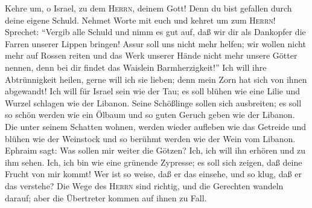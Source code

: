 Kehre um, o Israel, zu dem \textsc{Herrn}, deinem Gott!
Denn du bist gefallen durch deine eigene Schuld.  Nehmet
Worte mit euch und kehret um zum \textsc{Herrn}! Sprechet: ``Vergib alle
Schuld und nimm es gut auf, daß wir dir als Dankopfer die Farren unserer
Lippen bringen!  Assur soll uns nicht mehr helfen; wir
wollen nicht mehr auf Rossen reiten und das Werk unserer Hände nicht
mehr unsere Götter nennen, denn bei dir findet das Waislein
Barmherzigkeit!''  Ich will ihre Abtrünnigkeit heilen,
gerne will ich sie lieben; denn mein Zorn hat sich von ihnen abgewandt!
 Ich will für Israel sein wie der Tau; es soll blühen wie
eine Lilie und Wurzel schlagen wie der Libanon.  Seine
Schößlinge sollen sich ausbreiten; es soll so schön werden wie ein
Ölbaum und so guten Geruch geben wie der Libanon.  Die
unter seinem Schatten wohnen, werden wieder aufleben wie das Getreide
und blühen wie der Weinstock und so berühmt werden wie der Wein vom
Libanon.  Ephraim sagt: Was sollen mir weiter die Götzen?
Ich, ich will ihn erhören und zu ihm sehen. Ich, ich bin wie eine
grünende Zypresse; es soll sich zeigen, daß deine Frucht von mir kommt!
 Wer ist so weise, daß er das einsehe, und so klug, daß er
das verstehe? Die Wege des \textsc{Herrn} sind richtig, und die
Gerechten wandeln darauf; aber die Übertreter kommen auf ihnen zu Fall.
